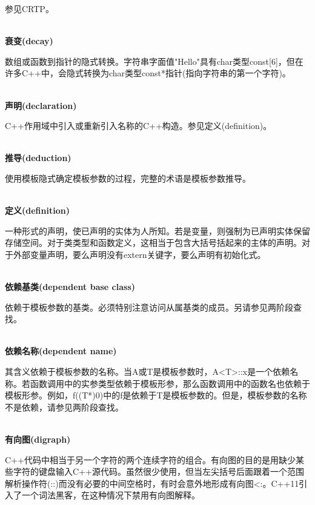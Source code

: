 参见CRTP。

\hspace*{\fill} \\ %
\noindent
\textbf{衰变(decay)}

数组或函数到指针的隐式转换。字符串字面值"Hello"具有char类型const[6]，但在许多C++中，会隐式转换为char类型const*指针(指向字符串的第一个字符)。

\hspace*{\fill} \\ %
\noindent
\textbf{声明(declaration)}

C++作用域中引入或重新引入名称的C++构造。参见定义(definition)。

\hspace*{\fill} \\ %
\noindent
\textbf{推导(deduction)}

使用模板隐式确定模板参数的过程，完整的术语是模板参数推导。

\hspace*{\fill} \\ %
\noindent
\textbf{定义(definition)}

一种形式的声明，使已声明的实体为人所知。若是变量，则强制为已声明实体保留存储空间。对于类类型和函数定义，这相当于包含大括号括起来的主体的声明。对于外部变量声明，要么声明没有extern关键字，要么声明有初始化式。

\hspace*{\fill} \\ %
\noindent
\textbf{依赖基类(dependent base class)}

依赖于模板参数的基类。必须特别注意访问从属基类的成员。另请参见两阶段查找。

\hspace*{\fill} \\ %
\noindent
\textbf{依赖名称(dependent name)}

其含义依赖于模板参数的名称。当A或T是模板参数时，A<T>::x是一个依赖名称。若函数调用中的实参类型依赖于模板形参，那么函数调用中的函数名也依赖于模板形参。例如，f((T*)0)中的f是依赖于T是模板参数的。但是，模板参数的名称不是依赖，请参见两阶段查找。

\hspace*{\fill} \\ %
\noindent
\textbf{有向图(digraph)}

C++代码中相当于另一个字符的两个连续字符的组合。有向图的目的是用缺少某些字符的键盘输入C++源代码。虽然很少使用，但当左尖括号后面跟着一个范围解析操作符(::)而没有必要的中间空格时，有时会意外地形成有向图<:。C++11引入了一个词法黑客，在这种情况下禁用有向图解释。

